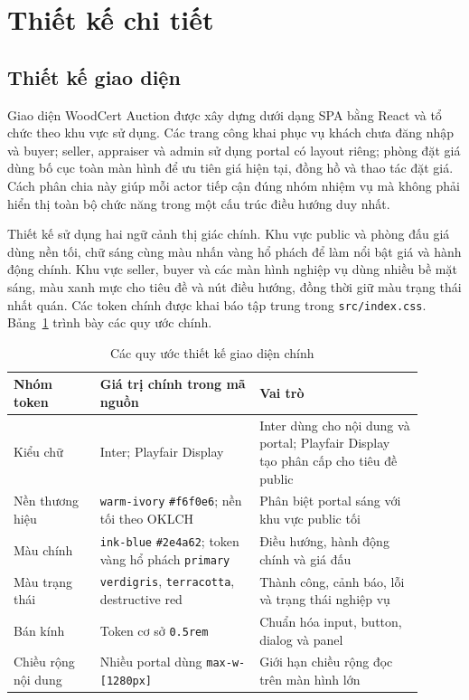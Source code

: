 \documentclass[../DoAn.tex]{subfiles}
\begin{document}
\FloatBarrier
\section{Thiết kế chi tiết}

\subsection{Thiết kế giao diện}

Giao diện WoodCert Auction được xây dựng dưới dạng SPA bằng React và tổ chức theo khu vực sử dụng. Các trang công khai phục vụ khách chưa đăng nhập và buyer; seller, appraiser và admin sử dụng portal có layout riêng; phòng đặt giá dùng bố cục toàn màn hình để ưu tiên giá hiện tại, đồng hồ và thao tác đặt giá. Cách phân chia này giúp mỗi actor tiếp cận đúng nhóm nhiệm vụ mà không phải hiển thị toàn bộ chức năng trong một cấu trúc điều hướng duy nhất.

Thiết kế sử dụng hai ngữ cảnh thị giác chính. Khu vực public và phòng đấu giá dùng nền tối, chữ sáng cùng màu nhấn vàng hổ phách để làm nổi bật giá và hành động chính. Khu vực seller, buyer và các màn hình nghiệp vụ dùng nhiều bề mặt sáng, màu xanh mực cho tiêu đề và nút điều hướng, đồng thời giữ màu trạng thái nhất quán. Các token chính được khai báo tập trung trong \texttt{src/index.css}. Bảng~\ref{tab:ui-design-tokens} trình bày các quy ước chính.

\begin{table}[H]
\centering
\small
\renewcommand{\arraystretch}{1.2}
\begin{tabular}{|>{\raggedright\arraybackslash}p{0.19\linewidth}|
                >{\raggedright\arraybackslash}p{0.35\linewidth}|
                >{\raggedright\arraybackslash}p{0.36\linewidth}|}
\hline
\textbf{Nhóm token} & \textbf{Giá trị chính trong mã nguồn} & \textbf{Vai trò} \\ \hline
Kiểu chữ & Inter; Playfair Display & Inter dùng cho nội dung và portal; Playfair Display tạo phân cấp cho tiêu đề public \\ \hline
Nền thương hiệu & \texttt{warm-ivory} \texttt{\#f6f0e6}; nền tối theo OKLCH & Phân biệt portal sáng với khu vực public tối \\ \hline
Màu chính & \texttt{ink-blue} \texttt{\#2e4a62}; token vàng hổ phách \texttt{primary} & Điều hướng, hành động chính và giá đấu \\ \hline
Màu trạng thái & \texttt{verdigris}, \texttt{terracotta}, destructive red & Thành công, cảnh báo, lỗi và trạng thái nghiệp vụ \\ \hline
Bán kính & Token cơ sở \texttt{0.5rem} & Chuẩn hóa input, button, dialog và panel \\ \hline
Chiều rộng nội dung & Nhiều portal dùng \texttt{max-w-[1280px]} & Giới hạn chiều rộng đọc trên màn hình lớn \\ \hline
\end{tabular}
\caption{Các quy ước thiết kế giao diện chính}
\label{tab:ui-design-tokens}
\end{table}
\FloatBarrier
\end{document}
